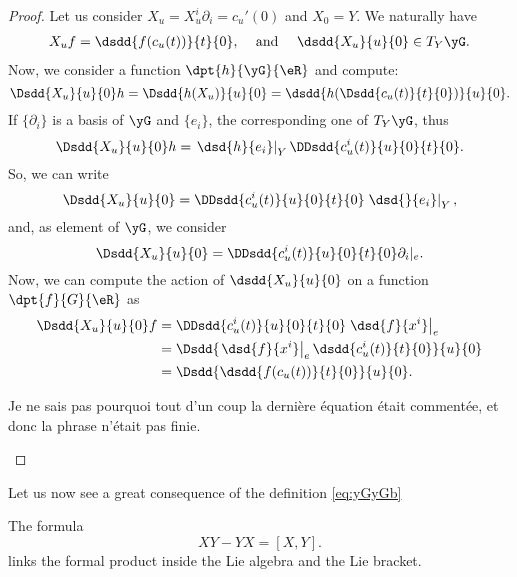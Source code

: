 								\begin{proof}
								Let us consider $X_u=X_u^i\partial_i=c_u'(0)$ and $X_0=Y$. We naturally have
								\begin{align}
								X_uf & =\dsdd{f(c_u(t))}{t}{0}, & \text{ and } &  & \dsdd{X_u}{u}{0}\in T_Y\yG.
								\end{align}
								Now, we consider a function $\dpt{h}{\yG}{\eR}$ and compute:
								\[
									\Dsdd{X_u}{u}{0}h=\Dsdd{h(X_u)}{u}{0}
									=\dsdd{ h(\Dsdd{c_u(t)}{t}{0}) }{u}{0}.
									\]
									If $\{\partial_i\}$ is a basis of $\yG$ and $\{e_i\}$, the corresponding one of $T_Y\yG$, thus
									\begin{equation}
									\Dsdd{X_u}{u}{0}h=\left.\dsd{h}{e_i}\right|_Y\DDsdd{c^i_u(t)}{u}{0}{t}{0}.
									\end{equation}
									So, we can write
									\[
										\Dsdd{X_u}{u}{0}=\DDsdd{c^i_u(t)}{u}{0}{t}{0}\left.\dsd{}{e_i}\right|_Y,
										\]
										and, as element of $\yG$, we consider
										\[
											\Dsdd{X_u}{u}{0}=\DDsdd{ c^i_u(t) }{u}{0}{t}{0}\partial_i|_e.
											\]
											Now, we can compute the action of $\dsdd{X_u}{u}{0}$ on a function $\dpt{f}{G}{\eR}$ as
											\begin{equation}
											\begin{split}
											\Dsdd{X_u}{u}{0}f&=\DDsdd{c^i_u(t)}{u}{0}{t}{0}\left.\dsd{f}{x^i}\right|_e\\
												&=\Dsdd{ \left.\dsd{f}{x^i}\right|_e\dsdd{c^i_u(t)}{t}{0}  }{u}{0}\\
												&=\Dsdd{ \dsdd{f(c_u(t))}{t}{0} }{u}{0}.
												\end{split}
												\end{equation}
												\begin{probleme}
												Je ne sais pas pourquoi tout d'un coup la dernière équation était commentée, et donc la phrase n'était pas finie.
												\end{probleme}

												\end{proof}

												Let us now see a great consequence of the definition \eqref{eq:yGyGb}
												\begin{proposition} \label{prop:XY_YX}
												The formula
												\begin{equation}
												XY-YX=[X,Y].
												\end{equation}
												links the formal product inside the Lie algebra and the Lie bracket.
												\end{proposition}

